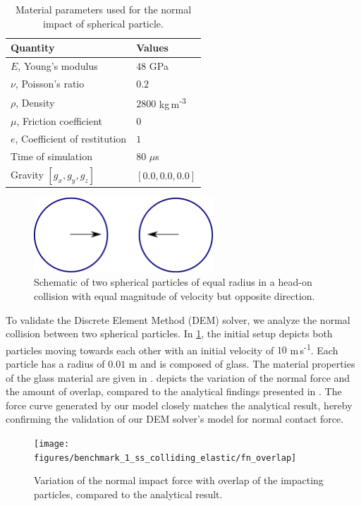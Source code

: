 \documentclass[preprint,12pt]{elsarticle}
\begin{document}
\begin{table}[!ht]
  \centering
  \begin{tabular}[!ht]{ll}
    \toprule
    Quantity & Values\\
    \midrule
    $E$, Young's modulus & $48$ GPa \\
    $\nu$, Poisson's ratio & $0.2$ \\
    $\rho$, Density & $2800$ kg\,m\textsuperscript{-3} \\
    $\mu$, Friction coefficient & $0$ \\
    $e$, Coefficient of restitution & $1$ \\
    Time of simulation & 80 $\mu$s \\
    Gravity $[g_x, g_y, g_z]$ & $[0.0, 0.0, 0.0]$\\
    \bottomrule
  \end{tabular}
  \caption{Material parameters used for the normal impact of spherical particle.}%
  \label{tab:dem_validation_1}
\end{table}
\begin{figure}[!htpb]
  \centering
  \includegraphics[width=0.6\textwidth]{images/results_dem_1_validation_particle_particle_impact/dem_01_head_on_schematic}
  \caption{Schematic of two spherical particles of equal radius in a
    head-on collision with equal magnitude of velocity but opposite direction.}
  \label{fig:result:dem_1_schematic}
\end{figure}
To validate the Discrete Element Method (DEM) solver, we analyze the normal
collision between two spherical particles.  In
\cref{fig:result:dem_1_schematic}, the initial setup depicts both particles
moving towards each other with an initial velocity of $10$
m\,s\textsuperscript{-1}.  Each particle has a radius of $0.01$ m and is
composed of glass. The material properties of the glass material are given in
.  depicts
the variation of the normal force and the amount of overlap, compared to the
analytical findings presented in \cite{chung2011benchmark}. The force curve
generated by our model closely matches the analytical result, hereby
confirming the validation of our DEM solver's model for normal contact force.
\begin{figure}[!htpb]
  \centering
  \texttt{[image: figures/benchmark\_1\_ss\_colliding\_elastic/fn\_overlap]}
  \caption{Variation of the normal impact force with overlap of the impacting
    particles, compared to the analytical result.}
  \label{fig:result:dem_1_force_vs_overlap}
\end{figure}
\end{document}

